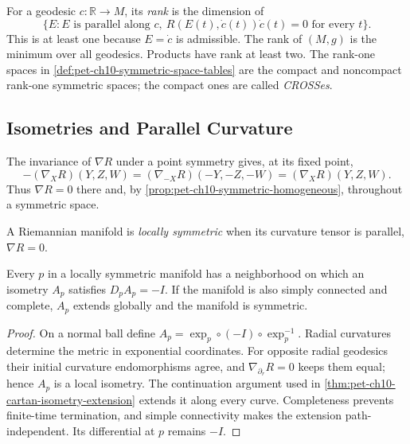 \begin{definition}
  \label{def:pet-ch10-rank}
  For a geodesic $c:\mathbb R\to M$, its \emph{rank} is the dimension of
  \[
    \{E:E\text{ is parallel along }c,
      \ R(E(t),\dot c(t))\dot c(t)=0\text{ for every }t\}.
  \]
  This is at least one because $E=\dot c$ is admissible. The rank of $(M,g)$
  is the minimum over all geodesics. Products have rank at least two. The
  rank-one spaces in \cref{def:pet-ch10-symmetric-space-tables} are the
  compact and noncompact rank-one symmetric spaces; the compact ones are
  called \emph{CROSSes}.
\end{definition}

\subsection{Isometries and Parallel Curvature}

The invariance of $\nabla R$ under a point symmetry gives, at its fixed point,
\[
  -(\nabla_XR)(Y,Z,W)
  =(\nabla_{-X}R)(-Y,-Z,-W)=(\nabla_XR)(Y,Z,W).
\]
Thus $\nabla R=0$ there and, by
\cref{prop:pet-ch10-symmetric-homogeneous}, throughout a symmetric space.

\begin{definition}
  \label{def:pet-ch10-locally-symmetric-space}
  A Riemannian manifold is \emph{locally symmetric} when its curvature tensor
  is parallel, $\nabla R=0$.
\end{definition}

\begin{theorem}
  \label{thm:pet-ch10-cartan-local-symmetry}
  Every $p$ in a locally symmetric manifold has a neighborhood on which an
  isometry $A_p$ satisfies $D_pA_p=-I$. If the manifold is also simply
  connected and complete, $A_p$ extends globally and the manifold is
  symmetric.
\end{theorem}
\begin{proof}
  \sketch
  On a normal ball define $A_p=\exp_p\circ(-I)\circ\exp_p^{-1}$. Radial
  curvatures determine the metric in exponential coordinates. For opposite
  radial geodesics their initial curvature endomorphisms agree, and
  $\nabla_{\partial_r}R=0$ keeps them equal; hence $A_p$ is a local isometry.
  The continuation argument used in
  \cref{thm:pet-ch10-cartan-isometry-extension} extends it along every curve.
  Completeness prevents finite-time termination, and simple connectivity makes
  the extension path-independent. Its differential at $p$ remains $-I$.
\end{proof}

